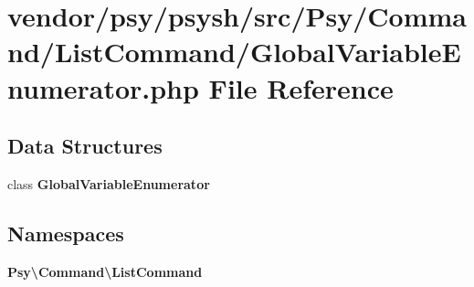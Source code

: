 \section{vendor/psy/psysh/src/\+Psy/\+Command/\+List\+Command/\+Global\+Variable\+Enumerator.php File Reference}
\label{_global_variable_enumerator_8php}
\subsection*{Data Structures}
\begin{DoxyCompactItemize}
\item 
class {\bf Global\+Variable\+Enumerator}
\end{DoxyCompactItemize}
\subsection*{Namespaces}
\begin{DoxyCompactItemize}
\item 
 {\bf Psy\textbackslash{}\+Command\textbackslash{}\+List\+Command}
\end{DoxyCompactItemize}
